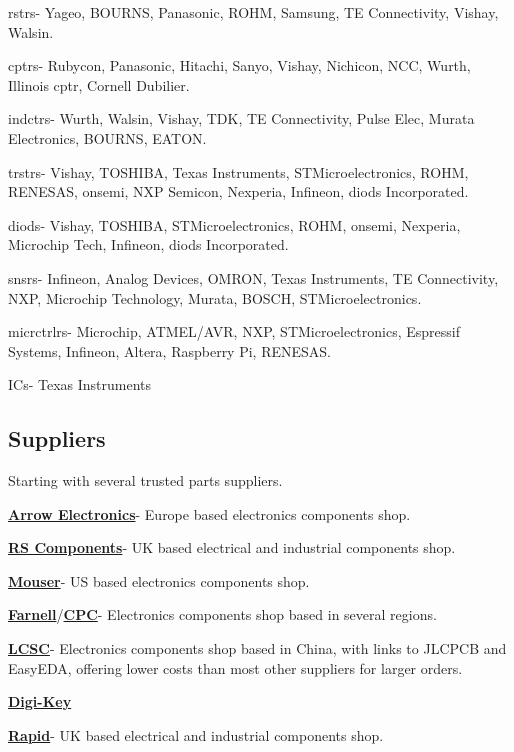 \documentclass[a4paper,11pt]{report}
\let\oldhref\href %
\renewcommand{\href}[2]{\oldhref{#1}{\bfseries#2}}
\begin{document}
\gls{rstr}s- Yageo, BOURNS, Panasonic, ROHM, Samsung, TE Connectivity, Vishay, Walsin.

\gls{cptr}s- Rubycon, Panasonic, Hitachi, Sanyo, Vishay, Nichicon, NCC, Wurth, Illinois \gls{cptr}, Cornell Dubilier.

\gls{indctr}s- Wurth, Walsin, Vishay, TDK, TE Connectivity, Pulse Elec, Murata Electronics, BOURNS, EATON.

\gls{trstr}s- Vishay, TOSHIBA, Texas Instruments, STMicroelectronics, ROHM, RENESAS, onsemi, NXP Semicon, Nexperia, Infineon, \gls{diod}s Incorporated.

\gls{diod}s- Vishay, TOSHIBA, STMicroelectronics, ROHM, onsemi, Nexperia, Microchip Tech, Infineon, \gls{diod}s Incorporated.

\gls{snsr}s- Infineon, Analog Devices, OMRON, Texas Instruments, TE Connectivity, NXP, Microchip Technology, Murata, BOSCH, STMicroelectronics.

\gls{micrctrlr}s- Microchip, ATMEL/AVR, NXP, STMicroelectronics, Espressif Systems, Infineon, Altera, Raspberry Pi, RENESAS.

ICs- Texas Instruments

\vspace*{1\baselineskip}

\subsection{Suppliers}

Starting with several trusted parts suppliers.

\href{https://www.arrow.com/}{Arrow Electronics}- Europe based electronics components shop.

\href{https://uk.rs-online.com/}{RS Components}- UK based electrical and industrial components shop.

\href{https://www.mouser.co.uk/}{Mouser}- US based electronics components shop.

\href{https://uk.farnell.com/}{Farnell}/\href{https://cpc.farnell.com/}{CPC}- Electronics components shop based in several regions.

\href{https://lcsc.com/}{LCSC}- Electronics components shop based in China, with links to JLCPCB and EasyEDA, offering lower costs than most other suppliers for larger orders.

\href{https://www.digikey.co.uk/}{Digi-Key}

\href{https://www.rapidonline.com/}{Rapid}- UK based electrical and industrial components shop.
\end{document}
